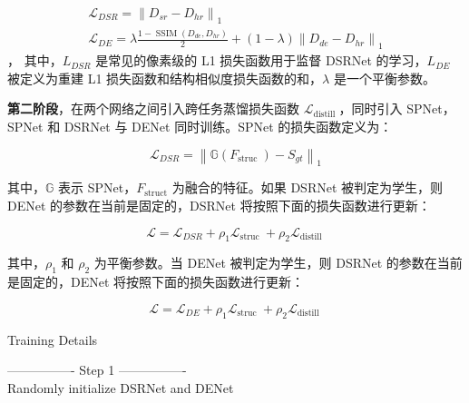 \documentclass{vip-theme}
\begin{document}
\begin{sloppypar}
\begin{equation}
\begin{gathered}
\mathcal{L}_{D S R}=\left\|D_{s r}-D_{h r}\right\|_{1} \\
\mathcal{L}_{D E}=\lambda \frac{1-\operatorname{SSIM}\left(D_{d e}, D_{h r}\right)}{2}+(1-\lambda)\left\|D_{d e}-D_{h r}\right\|_{1}
\end{gathered}
\end{equation}
，
其中，$L_{DSR}$ 是常见的像素级的 L1 损失函数用于监督 DSRNet 的学习，$L_{DE}$ 被定义为重建 L1 损失函数和结构相似度损失函数的和，$\lambda$ 是一个平衡参数。

\textbf{第二阶段}，在两个网络之间引入跨任务蒸馏损失函数 $\mathcal{L}_{\text {distill }}$，同时引入 SPNet，SPNet 和 DSRNet 与 DENet 同时训练。SPNet 的损失函数定义为：

\begin{equation}
\mathcal{L}_{D S R}=\left\|\mathbb{G}\left(F_{\text {struc }}\right)-S_{g t}\right\|_{1}
\end{equation}

其中，$\mathbb{G}$ 表示 SPNet，$F_{\text {struct}}$ 为融合的特征。如果 DSRNet 被判定为学生，则 DENet 的参数在当前是固定的，DSRNet 将按照下面的损失函数进行更新：

\begin{equation}
\mathcal{L}=\mathcal{L}_{D S R}+\rho_{1} \mathcal{L}_{\text {struc }}+\rho_{2} \mathcal{L}_{\text {distill }}
\end{equation}

其中，$\rho_1$ 和 $\rho_2$ 为平衡参数。当 DENet 被判定为学生，则 DSRNet 的参数在当前是固定的，DENet 将按照下面的损失函数进行更新：

\begin{equation}
\mathcal{L}=\mathcal{L}_{D E}+\rho_{1} \mathcal{L}_{\text {struc }}+\rho_{2} \mathcal{L}_{\text {distill }}
\end{equation}




\vspace{2em}
\begin{algorithm}[H]
        \caption{Training Details}
        \label{algorithm}
        \LinesNumbered
        ---------------- Step 1 ----------------\\
        Randomly initialize DSRNet and DENet\\
       

\end{algorithm}
\end{sloppypar}
\end{document}
